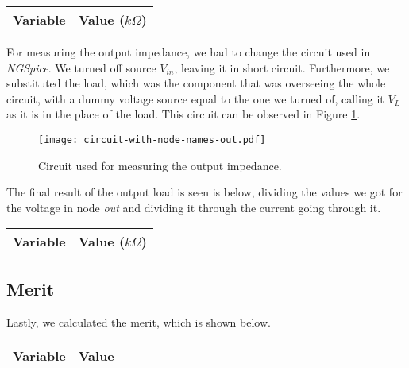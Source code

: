 \begin{tabular}{|l|r|}
  \hline    
  {\bf Variable} & {\bf Value ($k\Omega$)} \\ \hline
  
\end{tabular}

For measuring the output impedance, we had to change the circuit used in \textit{NGSpice}. We turned off source $V_{in}$, leaving it in short circuit. Furthermore, we substituted the load, which was the component that was overseeing the whole circuit, with a dummy voltage source equal to the one we turned of, calling it $V_L$ as it is in the place of the load. This circuit can be observed in Figure \ref{fig:circuit-2-spice}.

\begin{figure}[h] \centering
\texttt{[image: circuit-with-node-names-out.pdf]}
\caption{Circuit used for measuring the output impedance.}
\label{fig:circuit-2-spice}
\end{figure}

The final result of the output load is seen is below, dividing the values we got for the voltage in node \textit{out} and dividing it through the current going through it.

\begin{tabular}{|l|r|}
  \hline    
  {\bf Variable} & {\bf Value ($k\Omega$)} \\ \hline
  
\end{tabular}

\subsection{Merit}

Lastly, we calculated the merit, which is shown below.

\begin{tabular}{|l|r|}
  \hline    
  {\bf Variable} & {\bf Value} \\ \hline
  
\end{tabular}